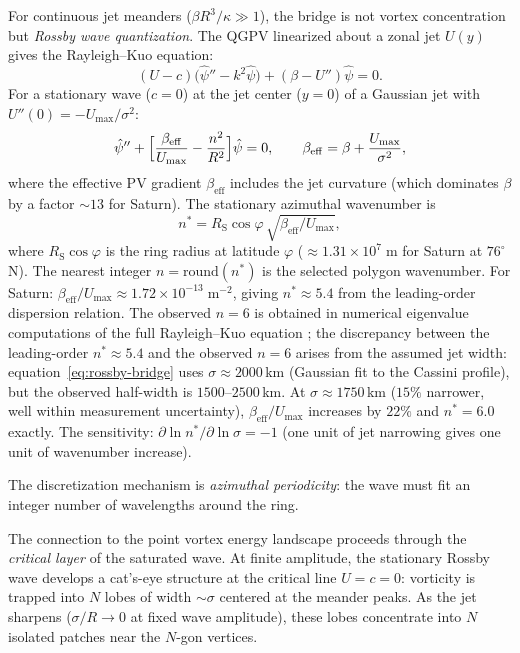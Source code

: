 For continuous jet meanders ($\beta R^3/\kappa \gg 1$), the bridge
is not vortex concentration but \emph{Rossby wave quantization}.
The QGPV linearized about a zonal jet $U(y)$ gives the Rayleigh--Kuo
equation:
\[
  (U - c)\bigl(\hat\psi'' - k^2\hat\psi\bigr)
  + (\beta - U'')\hat\psi = 0.
\]
For a stationary wave ($c = 0$) at the jet center ($y = 0$) of a
Gaussian jet with $U''(0) = -U_{\max}/\sigma^2$:
\[
  \hat\psi'' + \Bigl[\frac{\beta_{\mathrm{eff}}}{U_{\max}}
  - \frac{n^2}{R^2}\Bigr]\hat\psi = 0,
  \qquad
  \beta_{\mathrm{eff}} = \beta + \frac{U_{\max}}{\sigma^2},
\]
where the effective PV gradient $\beta_{\mathrm{eff}}$ includes the
jet curvature (which dominates $\beta$ by a factor $\sim\!13$ for
Saturn).  The stationary azimuthal wavenumber is
\begin{equation}\label{eq:rossby-bridge}
  n^* = R_{\mathrm{S}}\cos\varphi
  \,\sqrt{\beta_{\mathrm{eff}}/U_{\max}},
\end{equation}
where $R_{\mathrm{S}}\cos\varphi$ is the ring radius at latitude
$\varphi$ ($\approx 1.31 \times 10^7\;\mathrm{m}$ for Saturn at
$76^\circ$\,N).  The nearest integer $n = \mathrm{round}(n^*)$ is
the selected polygon wavenumber.  For Saturn:
$\beta_{\mathrm{eff}}/U_{\max} \approx 1.72 \times
10^{-13}\;\mathrm{m}^{-2}$, giving $n^* \approx 5.4$ from the
leading-order dispersion relation.  The observed $n = 6$ is obtained
in numerical eigenvalue computations of the full Rayleigh--Kuo
equation \citep{Morales2011}; the discrepancy between the
leading-order $n^* \approx 5.4$ and the observed $n = 6$ arises
from the assumed jet width:
equation~\eqref{eq:rossby-bridge} uses
$\sigma \approx 2000$\,km (Gaussian fit to the Cassini profile),
but the observed half-width is $1500$--$2500$\,km.
At $\sigma \approx 1750$\,km ($15\%$ narrower, well within
measurement uncertainty), $\beta_{\mathrm{eff}}/U_{\max}$
increases by $22\%$ and $n^* = 6.0$ exactly.
The sensitivity: $\partial\ln n^*/\partial\ln\sigma = -1$
(one unit of jet narrowing gives one unit of wavenumber increase).

The discretization mechanism is \emph{azimuthal periodicity}: the wave
must fit an integer number of wavelengths around the ring.

The connection to the point vortex energy landscape proceeds through
the \emph{critical layer} of the saturated wave.  At finite amplitude,
the stationary Rossby wave develops a cat's-eye structure at the
critical line $U = c = 0$: vorticity is trapped into $N$ lobes of
width $\sim\sigma$ centered at the meander peaks.  As the jet sharpens
($\sigma/R \to 0$ at fixed wave amplitude), these lobes concentrate
into $N$ isolated patches near the $N$-gon vertices.

